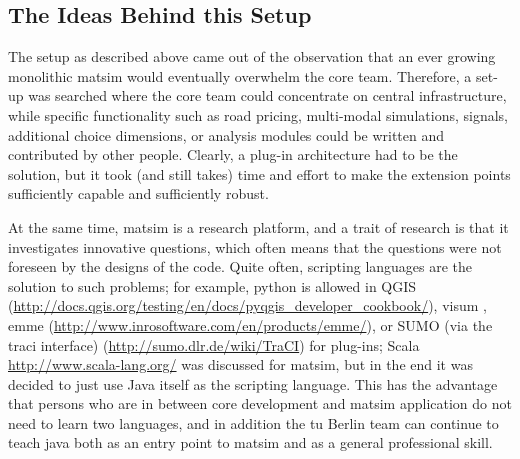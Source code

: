 
\subsection{The Ideas Behind this Setup}
The setup as described above came out of the observation that an ever growing monolithic \gls{matsim} would eventually overwhelm the core team. Therefore, a set-up was searched where the core team could concentrate on central infrastructure, while specific functionality such as road pricing, multi-modal simulations, signals, additional choice dimensions, or analysis modules could be written and contributed by other people. Clearly, a plug-in architecture had to be the solution, but it took (and still takes) time and effort to make the extension points sufficiently capable and sufficiently robust.  

At the same time, \gls{matsim} is a research platform, and a trait of research is that it investigates innovative questions, which often means that the questions were not foreseen by the designs of the code. 
Quite often, scripting languages are the solution to such problems; 
for example, python is allowed in QGIS (\url{http://docs.qgis.org/testing/en/docs/pyqgis_developer_cookbook/}), 
\gls{visum} \citep{VISUM_manualNewFeatures_2011},
\gls{emme} (\url{http://www.inrosoftware.com/en/products/emme/}), or 
SUMO (via the traci interface) (\url{http://sumo.dlr.de/wiki/TraCI}) 
for plug-ins; 
Scala \url{http://www.scala-lang.org/}
was discussed for \gls{matsim}, but in the end it was decided to just use Java itself as the scripting language. 
This has the advantage that persons who are in between core development and \gls{matsim} application do not need to learn two languages, and in addition the \gls{tu} Berlin team can continue to teach \gls{java} both as an entry point to \gls{matsim} and as a general professional skill.

